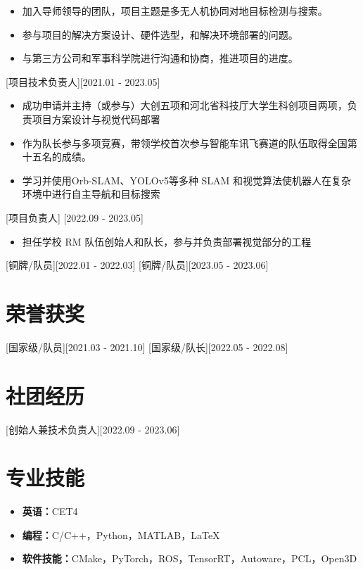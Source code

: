 \documentclass{resume}
\begin{document}
\begin{itemize}
  \item 加入导师领导的团队，项目主题是多无人机协同对地目标检测与搜索。
  \item 参与项目的解决方案设计、硬件选型，和解决环境部署的问题。
  \item 与第三方公司和军事科学院进行沟通和协商，推进项目的进度。
\end{itemize}


[项目技术负责人][2021.01 - 2023.05] 

\begin{itemize}
  \item 成功申请并主持（或参与）大创五项和河北省科技厅大学生科创项目两项，负责项目方案设计与视觉代码部署
  \item 作为队长参与多项竞赛，带领学校首次参与智能车讯飞赛道的队伍取得全国第十五名的成绩。
  \item 学习并使用Orb-SLAM、YOLOv5等多种 SLAM 和视觉算法使机器人在复杂环境中进行自主导航和目标搜索
\end{itemize}

[项目负责人]
[2022.09 - 2023.05] 

\begin{itemize}
  \item 担任学校 RM 队伍创始人和队长，参与并负责部署视觉部分的工程
\end{itemize}
[铜牌/队员][2022.01 - 2022.03] 
[铜牌/队员][2023.05 - 2023.06] 




\section{荣誉获奖}

[国家级/队员][2021.03 - 2021.10] 
[国家级/队长][2022.05 - 2022.08] 


\section{社团经历}
[创始人兼技术负责人][2022.09 - 2023.06]


\section{专业技能}
\begin{itemize}
    \item \textbf{英语：}CET4
    \item \textbf{编程：}C/C++，Python，MATLAB，LaTeX
    \item \textbf{软件技能：}CMake，PyTorch，ROS，TensorRT，Autoware，PCL，Open3D
\end{itemize}
\end{document}

